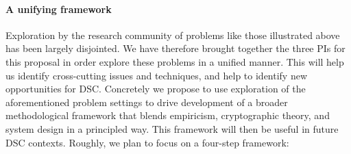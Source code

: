 \paragraph{A unifying framework} 
Exploration by the research community of
problems like those illustrated above has been largely disjointed. 
We have therefore brought together the three PIs
for this proposal in order explore these problems in a unified manner. This will
help us identify cross-cutting issues and techniques, and help to identify new
opportunities for DSC. Concretely we propose to  use exploration of the aforementioned 
problem settings to drive development of a broader methodological 
framework that blends empiricism, cryptographic theory, and system design in a
principled way. This framework will then be useful in future DSC contexts. 
Roughly, we plan to focus on a four-step framework:
